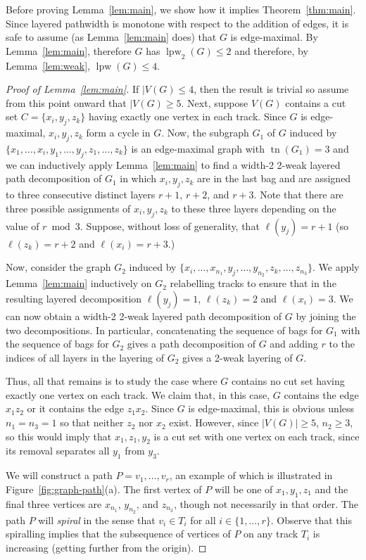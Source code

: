 \documentclass{jgaa-art}
\newcommand{\figref}[1]{\mbox{Figure~\ref{fig:#1}}}
\newcommand{\thmref}[1]{Theorem~\ref{thm:#1}}
\newcommand{\lemref}[1]{Lemma~\ref{lem:#1}}
\DeclareMathOperator{\tr}{tn}
\DeclareMathOperator{\lpw}{lpw}
\begin{document}
Before proving \lemref{main}, we show how it implies \thmref{main}.
Since layered pathwidth is monotone with respect to the addition of edges,
it is safe to assume (as \lemref{main} does) that $G$ is edge-maximal.
By \lemref{main}, therefore $G$ has $\lpw_2(G)\le2$ and therefore, by
\lemref{weak}, $\lpw(G)\le 4$.

\begin{proof}[Proof of \lemref{main}]
  If $|V(G)\le 4$, then the result is trivial so assume from this point onward that $|V(G)\ge 5$.  Next, suppose $V(G)$ contains
  a cut set $C=\{x_i,y_j,z_k\}$ having exactly one vertex in each track.
  Since $G$ is edge-maximal, $x_i,y_j,z_k$ form a cycle in $G$.  Now,
  the subgraph $G_1$ of $G$ induced by $\{x_1,\ldots,x_i, y_1,\ldots,y_j,
  z_1,\ldots,z_k\}$ is an edge-maximal graph with $\tr(G_1)=3$ and we
  can inductively apply \lemref{main} to find a width-2 2-weak layered
  path decomposition of $G_1$ in which $x_i,y_j,z_k$ are in the last bag
  and are assigned to three consecutive distinct layers $r+1$, $r+2$, and $r+3$.
  Note that there are three possible assignments of $x_i,y_j,z_k$ to
  these three layers depending on the value of $r\bmod 3$.  Suppose,
  without loss of generality, that $\ell(y_j)=r+1$ (so $\ell(z_k)=r+2$
  and $\ell(x_i)=r+3$.)

  Now, consider the graph $G_2$ induced by
  $\{x_i,\ldots,x_{n_1},y_j,\ldots,y_{n_2},z_k,\ldots,z_{n_3}\}$.
  We apply \lemref{main} inductively on $G_2$ relabelling tracks to
  ensure that in the resulting layered decomposition $\ell(y_j)=1$,
  $\ell(z_k)=2$ and $\ell(x_i)=3$.   We can now obtain a width-2 2-weak
  layered path decomposition of $G$ by joining the two decompositions.
  In particular, concatenating the sequence of bags for $G_1$ with
  the sequence of bags for $G_2$ gives a path decomposition of $G$
  and adding $r$ to the indices of all layers in the layering of $G_2$
  gives a 2-weak layering of $G$.

  Thus, all that remains is to study the case where $G$ contains no cut
  set having exactly one vertex on each track.  We claim that, in this
  case, $G$ contains the edge $x_1z_2$ or it contains the edge $z_1x_2$.
  Since $G$ is edge-maximal, this is obvious unless $n_1=n_3=1$ so
  that neither $z_2$ nor $x_2$ exist.  However, since $|V(G)|\ge 5$, $n_2\ge 3$, so  this would imply that $x_1,z_1,y_2$ is a cut set with one vertex on
  each track, since its removal separates all $y_1$ from $y_3$.

  We will construct a path $P=v_1,\ldots,v_r$, an example of which is illustrated in \figref{graph-path}(a). The first vertex of $P$ will be one of
  $x_1,y_1,z_1$ and the final three vertices are $x_{n_1}$,
  $y_{n_2}$, and $z_{n_3}$, though not necessarily in that order.
  The path $P$ will \emph{spiral} in the sense that $v_i\in T_i$
  for all $i\in\{1,\ldots,r\}$.  Observe that this spiralling implies that the subsequence of vertices of $P$ on any track $T_i$ is increasing (getting further from the origin).


\end{proof}
\end{document}
